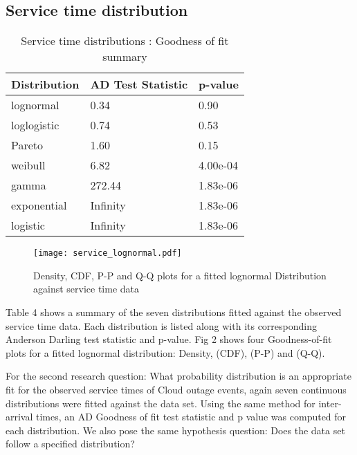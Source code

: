 \documentclass[5p]{elsarticle}
\begin{document}
\subsection{Service time distribution}

\begin {table}
\caption {Service time distributions :  Goodness of fit summary} 
\begin{center}
\begin{tabular}{p{2.1cm} |  p{3.1cm} | p{1.3cm}} \hline \bf{Distribution} & \bf{AD Test Statistic} & \bf{p-value}
\\ \hline lognormal & 0.34 & 0.90
\\ loglogistic & 0.74 & 0.53
\\ Pareto & 1.60 & 0.15 
\\ weibull  & 6.82 & 4.00e-04 
\\ gamma & 272.44 & 1.83e-06	
\\ exponential & Infinity & 1.83e-06
\\ logistic & Infinity  & 1.83e-06	
\\ \hline
\end{tabular}
\end{center}
\end{table}

\begin{figure*}[]
\begin{center}
\texttt{[image: service\_lognormal.pdf]} 
\caption{Density, CDF, P-P and Q-Q plots for a fitted lognormal Distribution against service time data}
\end{center}
\label{fig:outagedistribution}
\end{figure*}


Table 4 shows a summary of the seven distributions fitted against the observed service time data. Each distribution is listed along with its corresponding Anderson Darling test statistic and p-value. Fig 2 shows four Goodness-of-fit plots for a fitted lognormal distribution: Density, (CDF), (P-P)  and (Q-Q).  

For the second research question: What probability distribution is an appropriate fit for the observed service times of Cloud outage events, again seven continuous distributions were fitted against the data set. Using the same method for inter-arrival times, an AD Goodness of fit test statistic and p value was computed for each distribution. We also pose the same hypothesis question: Does the data set follow a specified distribution?
\end{document}
